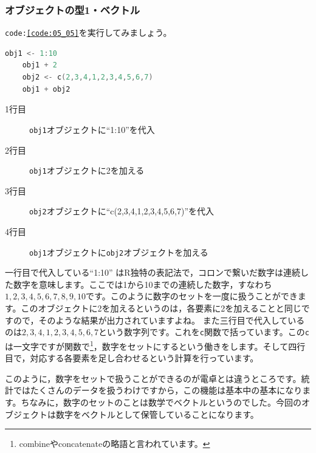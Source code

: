 \documentclass{ltjsbook}
\begin{document}
\subsubsection{オブジェクトの型1・ベクトル}
\texttt{code:\ref{code:05_05}}を実行してみましょう。
\begin{lstlisting}[language=c++,label={code:05_05},caption={ベクトル処理}]
	obj1 <- 1:10
	obj1 + 2
	obj2 <- c(2,3,4,1,2,3,4,5,6,7)
	obj1 + obj2
\end{lstlisting}

\begin{description}
	\item[1行目] \texttt{obj1}オブジェクトに``1:10''を代入
	\item[2行目] \texttt{obj1}オブジェクトに2を加える
	\item[3行目] \texttt{obj2}オブジェクトに``c(2,3,4,1,2,3,4,5,6,7)''を代入
	\item[4行目] \texttt{obj1}オブジェクトに\texttt{obj2}オブジェクトを加える
\end{description}

一行目で代入している``1:10'' はR独特の表記法で，コロンで繋いだ数字は連続した数字を意味します。ここでは1から10までの連続した数字，すなわち$1,2,3,4,5,6,7,8,9,10$です。このように数字のセットを一度に扱うことができます。このオブジェクトに2を加えるというのは，各要素に2を加えることと同じですので，そのような結果が出力されていますよね。
また三行目で代入しているのは$2,3,4,1,2,3,4,5,6,7$という数字列です。これを\texttt{c}関数で括っています。この\texttt{c}は一文字ですが関数で\footnote{combineやconcatenateの略語と言われています。}，数字をセットにするという働きをします。そして四行目で，対応する各要素を足し合わせるという計算を行っています。

このように，数字をセットで扱うことができるのが電卓とは違うところです。統計ではたくさんのデータを扱うわけですから，この機能は基本中の基本になります。ちなみに，数字のセットのことは数学でベクトルというのでした。今回のオブジェクトは数字をベクトルとして保管していることになります。
\end{document}
